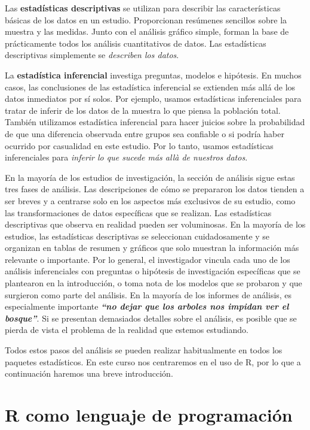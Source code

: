 \documentclass[
]{book}
\begin{document}
Las \textbf{estadísticas descriptivas} se utilizan para describir las características básicas de los datos en un estudio. Proporcionan resúmenes sencillos sobre la muestra y las medidas. Junto con el análisis gráfico simple, forman la base de prácticamente todos los análisis cuantitativos de datos. Las estadísticas descriptivas simplemente se \emph{describen los datos}.

La \textbf{estadística inferencial} investiga preguntas, modelos e hipótesis. En muchos casos, las conclusiones de las estadística inferencial se extienden más allá de los datos inmediatos por sí solos. Por ejemplo, usamos estadísticas inferenciales para tratar de inferir de los datos de la muestra lo que piensa la población total. También utilizamos estadística inferencial para hacer juicios sobre la probabilidad de que una diferencia observada entre grupos sea confiable o si podría haber ocurrido por casualidad en este estudio. Por lo tanto, usamos estadísticas inferenciales para \emph{inferir lo que sucede más allà de nuestros datos}.

En la mayoría de los estudios de investigación, la sección de análisis sigue estas tres fases de análisis. Las descripciones de cómo se prepararon los datos tienden a ser breves y a centrarse solo en los aspectos más exclusivos de su estudio, como las transformaciones de datos específicas que se realizan. Las estadísticas descriptivas que observa en realidad pueden ser voluminosas. En la mayoría de los estudios, las estadísticas descriptivas se seleccionan cuidadosamente y se organizan en tablas de resumen y gráficos que solo muestran la información más relevante o importante. Por lo general, el investigador vincula cada uno de los análisis inferenciales con preguntas o hipótesis de investigación específicas que se plantearon en la introducción, o toma nota de los modelos que se probaron y que surgieron como parte del análisis. En la mayoría de los informes de análisis, es especialmente importante \textbf{\emph{``no dejar que los arboles nos impidan ver el bosque''}}. Si se presentan demasiados detalles sobre el análisis, es posible que se pierda de vista el problema de la realidad que estemos estudiando.

Todos estos pasos del análisis se pueden realizar habitualmente en todos los paquetes estadísticos. En este curso nos centraremos en el uso de R, por lo que a continuación haremos una breve introducción.

\hypertarget{r-como-lenguaje-de-programaciuxf3n}{%
\section{R como lenguaje de programación}\label{r-como-lenguaje-de-programaciuxf3n}}
\end{document}
